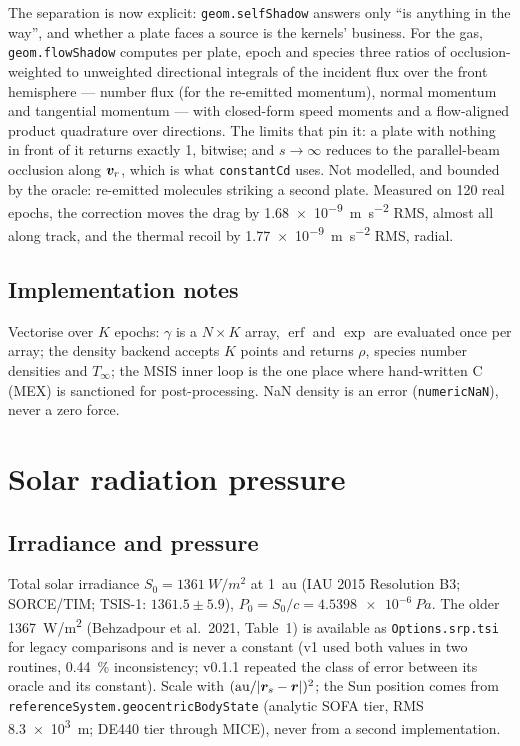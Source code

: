 The separation is now explicit: \texttt{geom.selfShadow} answers only ``is anything in the way'', and
whether a plate faces a source is the kernels' business. For the gas, \texttt{geom.flowShadow}
computes per plate, epoch and species three ratios of occlusion-weighted to unweighted directional
integrals of the incident flux over the front hemisphere --- number flux (for the re-emitted
momentum), normal momentum and tangential momentum --- with closed-form speed moments and a
flow-aligned product quadrature over directions. The limits that pin it: a plate with nothing in
front of it returns exactly 1, bitwise; and $s\to\infty$ reduces to the parallel-beam occlusion along
$\bm{v}_r$, which is what \texttt{constantCd} uses. Not modelled, and bounded by the oracle:
re-emitted molecules striking a second plate. Measured on 120 real epochs, the correction moves the
drag by \SI{1.68e-9}{\metre\per\second\squared} RMS, almost all along track, and the thermal recoil
by \SI{1.77e-9}{\metre\per\second\squared} RMS, radial.

\subsection{Implementation notes}
Vectorise over $K$ epochs: $\gamma$ is a $N\times K$ array, $\operatorname{erf}$ and $\exp$ are evaluated once per array; the density backend accepts $K$ points and returns $\rho$, species number densities and $T_\infty$; the MSIS inner loop is the one place where hand-written C (MEX) is sanctioned for post-processing. NaN density is an error (\texttt{numericNaN}), never a zero force.

\section{Solar radiation pressure}
\subsection{Irradiance and pressure}
Total solar irradiance $S_0=\SI{1361}{W/m^2}$ at \SI{1}{au} (IAU 2015 Resolution B3; SORCE/TIM; TSIS-1: $1361.5\pm5.9$), $P_0=S_0/c=\SI{4.5398e-6}{Pa}$. The older \SI{1367}{W/m^2} (Behzadpour et al.\ 2021, Table~1) is available as \texttt{Options.srp.tsi} for legacy comparisons and is never a constant (v1 used both values in two routines, \SI{0.44}{\percent} inconsistency; v0.1.1 repeated the class of error between its oracle and its constant). Scale with $(\mathrm{au}/|\bm{r}_s-\bm{r}|)^2$; the Sun position comes from \texttt{referenceSystem.geocentricBodyState} (analytic SOFA tier, RMS \SI{8.3e3}{\metre}; DE440 tier through MICE), never from a second implementation.


